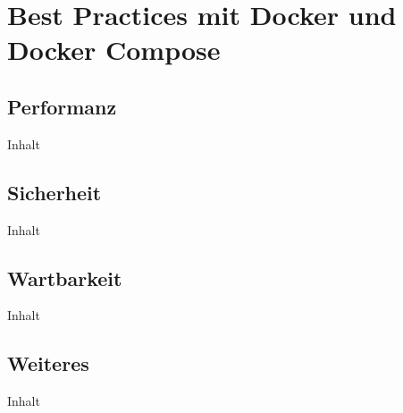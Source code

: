 \section{Best Practices mit Docker und Docker Compose}
\label{sec:05-03_best-practices-with-docker-and-docker-compose}

\subsection{Performanz}
\label{subsec:05-03-01_performance}

Inhalt

\subsection{Sicherheit}
\label{subsec:05-03-02_security}

Inhalt

\subsection{Wartbarkeit}
\label{subsec:05-03-03_maintainability}

Inhalt

\subsection{Weiteres}
\label{subsec:05-03-04_further}

Inhalt
